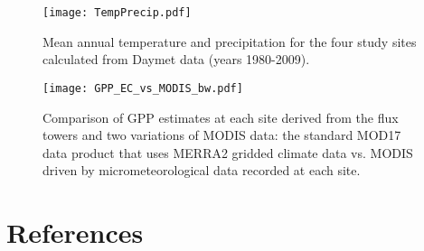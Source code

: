 \documentclass[]{article}
\begin{document}
\begin{figure}[ht]
	\begin{measuredfigure}
		\texttt{[image: TempPrecip.pdf]}
		\caption{Mean annual temperature and precipitation for the four study sites calculated from Daymet data (years 1980-2009).}
		\label{fig:tempprecip}
	\end{measuredfigure}
\end{figure}

\begin{figure}[ht]
	\begin{measuredfigure}
		\texttt{[image: GPP\_EC\_vs\_MODIS\_bw.pdf]}
		\caption{Comparison of GPP estimates at each site derived from the flux towers and two variations of MODIS data: the standard MOD17 data product that uses MERRA2 gridded climate data vs. MODIS driven by micrometeorological data recorded at each site.}
		\label{fig:modis}
	\end{measuredfigure}
\end{figure}

\section{References}


\end{document}
